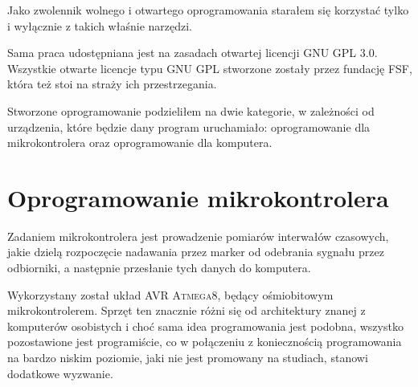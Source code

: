 \label{ch:implementation}

Jako zwolennik wolnego i otwartego oprogramowania starałem się korzystać tylko i wyłącznie z takich właśnie narzędzi.

Sama praca udostępniana jest na zasadach otwartej licencji \textsc{GNU GPL 3.0}. Wszystkie otwarte licencje typu \textsc{GNU GPL} stworzone zostały przez fundację FSF, która też stoi na straży ich przestrzegania.

Stworzone oprogramowanie podzieliłem na dwie kategorie, w zależności od urządzenia, które będzie dany program uruchamiało: oprogramowanie dla mikrokontrolera oraz oprogramowanie dla komputera.

\section{Oprogramowanie mikrokontrolera}
Zadaniem mikrokontrolera jest prowadzenie pomiarów interwałów czasowych, jakie dzielą rozpoczęcie nadawania przez marker od odebrania sygnału przez odbiorniki, a następnie przesłanie tych danych do komputera.

Wykorzystany został układ \textsc{AVR Atmega8}, będący ośmiobitowym mikrokontrolerem. Sprzęt ten znacznie różni się od architektury znanej z komputerów osobistych  i choć sama idea programowania jest podobna, wszystko pozostawione jest programiście, co w połączeniu z koniecznością programowania na bardzo niskim poziomie, jaki nie jest promowany na studiach, stanowi dodatkowe wyzwanie.

